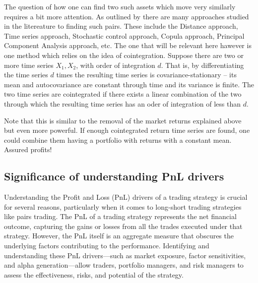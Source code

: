 The question of how one can find two such assets which move very similarly requires a bit more attention. As outlined by \cite{review_statistical_arbitrage} there are many approaches studied in the litereature to finding such pairs. These include the Distance approach, Time series approach, Stochastic control approach, Copula approach, Principal Component Analysis approach, etc. The one that will be relevant here hawever is one method which relies on the idea of cointegration. Suppose there are two or more time series $X_1, X_2$, with order of integration $d$. That is, by differentiating the time series $d$ times the resulting time series is covariance-stationary -- its mean and autocovariance are constant through time and its variance is finite. The two time series are cointegrated if there exists a linear combination of the two through which the resulting time series has an oder of integration of less than $d$. 

Note that this is similar to the removal of the market returns explained above but even more powerful. If enough cointegrated return time series are found, one could combine them having a portfolio with returns with a constant mean. Assured profits!

\subsection{Significance of understanding PnL drivers}
Understanding the Profit and Loss (PnL) drivers of a trading strategy is crucial for several reasons, particularly when it comes to long-short trading strategies like pairs trading. The PnL of a trading strategy represents the net financial outcome, capturing the gains or losses from all the trades executed under that strategy. However, the PnL itself is an aggregate measure that obscures the underlying factors contributing to the performance. Identifying and understanding these PnL drivers—such as market exposure, factor sensitivities, and alpha generation—allow traders, portfolio managers, and risk managers to assess the effectiveness, risks, and potential of the strategy.

